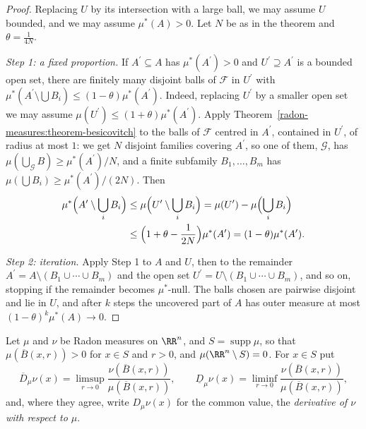 \begin{proof}
Replacing $U$ by its intersection with a large ball, we may assume $U$ bounded, and we may assume $\mu^*(A) > 0$. Let $N$ be as in the theorem and $\theta = \frac1{4N}$.

\emph{Step 1: a fixed proportion.} If $A^{\prime} \subseteq A$ has $\mu^*(A^{\prime}) > 0$ and $U^{\prime} \supseteq A^{\prime}$ is a bounded open set, there are finitely many disjoint balls of $\mathcal{F}$ in
$U^{\prime}$ with $\mu^*(A^{\prime} \setminus \bigcup B_i) \leq (1 - \theta)\mu^*(A^{\prime})$. Indeed, replacing $U^{\prime}$ by a smaller open set we may assume
$\mu(U^{\prime}) \leq (1 + \theta)\mu^*(A^{\prime})$. Apply Theorem~\ref{radon-measures:theorem-besicovitch} to the balls of $\mathcal{F}$ centred in $A^{\prime}$, contained in $U^{\prime}$, of radius at most
$1$: we get $N$ disjoint families covering $A^{\prime}$, so one of them, $\mathcal{G}$, has $\mu(\bigcup_{\mathcal{G}}B) \geq \mu^*(A^{\prime})/N$, and a finite subfamily $B_1, \ldots, B_m$ has
$\mu(\bigcup B_i) \geq \mu^*(A^{\prime})/(2N)$. Then
\[\begin{aligned}
\mu^*\Bigl(A^{\prime} \setminus \bigcup_iB_i\Bigr) &\leq \mu\Bigl(U^{\prime} \setminus \bigcup_iB_i\Bigr) = \mu(U^{\prime}) - \mu\Bigl(\bigcup_iB_i\Bigr) \\
&\leq \Bigl(1 + \theta - \frac1{2N}\Bigr)\mu^*(A^{\prime}) = (1 - \theta)\mu^*(A^{\prime}).
\end{aligned}\]

\emph{Step 2: iteration.} Apply Step 1 to $A$ and $U$, then to the remainder $A^{\prime} = A \setminus (B_1 \cup \cdots \cup B_m)$ and the open set $U^{\prime} = U \setminus (B_1 \cup \cdots \cup B_m)$, and so on,
stopping if the remainder becomes $\mu^*$-null. The balls chosen are pairwise disjoint and lie in $U$, and after $k$ steps the uncovered part of $A$ has outer measure at most
$(1 - \theta)^k\mu^*(A) \to 0$.
\end{proof}

\begin{definition}\label{radon-measures:definition-derivative-radon}
Let $\mu$ and $\nu$ be Radon measures on $\RR^n$, and $S = \operatorname{supp}\mu$, so that $\mu(\overline{B}(x, r)) > 0$ for $x \in S$ and $r > 0$, and $\mu(\RR^n \setminus S) = 0$. For $x \in S$ put
\[
\overline{D}_\mu\nu(x) = \limsup_{r \to 0}\frac{\nu(\overline{B}(x, r))}{\mu(\overline{B}(x, r))}, \qquad \underline{D}_\mu\nu(x) = \liminf_{r \to 0}\frac{\nu(\overline{B}(x, r))}{\mu(\overline{B}(x, r))},
\]
and, where they agree, write $D_\mu\nu(x)$ for the common value, the \emph{derivative of $\nu$ with respect to $\mu$}.
\end{definition}

